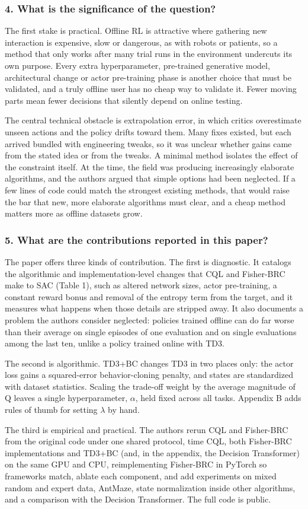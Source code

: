 \documentclass[11pt]{article}
\newcommand{\question}[1]{\subsubsection*{#1}}
\begin{document}
\question{4. What is the significance of the question?}

The first stake is practical. Offline RL is attractive where gathering new interaction is expensive, slow or dangerous, as with robots or patients, so a method that only works after many trial runs in the environment undercuts its own purpose. Every extra hyperparameter, pre-trained generative model, architectural change or actor pre-training phase is another choice that must be validated, and a truly offline user has no cheap way to validate it. Fewer moving parts mean fewer decisions that silently depend on online testing.

The central technical obstacle is extrapolation error, in which critics overestimate unseen actions and the policy drifts toward them. Many fixes existed, but each arrived bundled with engineering tweaks, so it was unclear whether gains came from the stated idea or from the tweaks. A minimal method isolates the effect of the constraint itself. At the time, the field was producing increasingly elaborate algorithms, and the authors argued that simple options had been neglected. If a few lines of code could match the strongest existing methods, that would raise the bar that new, more elaborate algorithms must clear, and a cheap method matters more as offline datasets grow.

\question{5. What are the contributions reported in this paper?}

The paper offers three kinds of contribution. The first is diagnostic. It catalogs the algorithmic and implementation-level changes that CQL and Fisher-BRC make to SAC (Table 1), such as altered network sizes, actor pre-training, a constant reward bonus and removal of the entropy term from the target, and it measures what happens when those details are stripped away. It also documents a problem the authors consider neglected: policies trained offline can do far worse than their average on single episodes of one evaluation and on single evaluations among the last ten, unlike a policy trained online with TD3.

The second is algorithmic. TD3+BC changes TD3 in two places only: the actor loss gains a squared-error behavior-cloning penalty, and states are standardized with dataset statistics. Scaling the trade-off weight by the average magnitude of Q leaves a single hyperparameter, \ensuremath{\alpha}, held fixed across all tasks. Appendix B adds rules of thumb for setting \ensuremath{\lambda} by hand.

The third is empirical and practical. The authors rerun CQL and Fisher-BRC from the original code under one shared protocol, time CQL, both Fisher-BRC implementations and TD3+BC (and, in the appendix, the Decision Transformer) on the same GPU and CPU, reimplementing Fisher-BRC in PyTorch so frameworks match, ablate each component, and add experiments on mixed random and expert data, AntMaze, state normalization inside other algorithms, and a comparison with the Decision Transformer. The full code is public.
\end{document}
